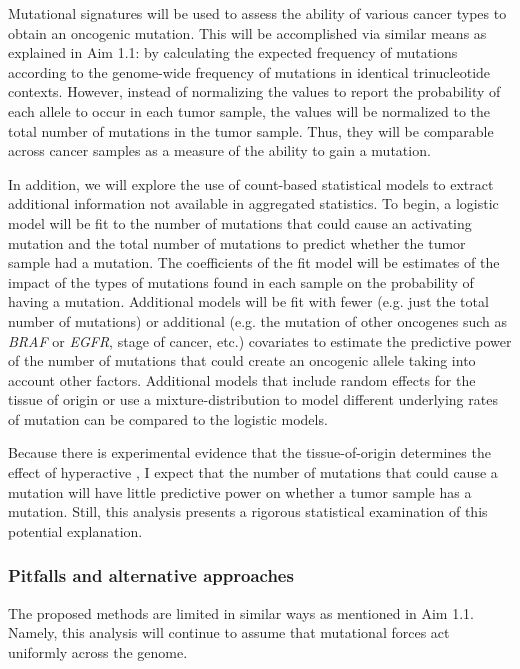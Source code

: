 Mutational signatures will be used to assess the ability of various cancer types to obtain an oncogenic \KRAS{} mutation.
This will be accomplished via similar means as explained in Aim 1.1: by calculating the expected frequency of \KRAS{} mutations according to the genome-wide frequency of mutations in identical trinucleotide contexts.
However, instead of normalizing the values to report the probability of each allele to occur in each tumor sample, the values will be normalized to the total number of mutations in the tumor sample.
Thus, they will be comparable across cancer samples as a measure of the ability to gain a \KRAS{} mutation.

In addition, we will explore the use of count-based statistical models to extract additional information not available in aggregated statistics.
To begin, a logistic model will be fit to the number of mutations that could cause an activating \KRAS{} mutation and the total number of mutations to predict whether the tumor sample had a \KRAS{} mutation.
The coefficients of the fit model will be estimates of the impact of the types of mutations found in each sample on the probability of having a \KRAS{} mutation.
Additional models will be fit with fewer (e.g. just the total number of mutations) or additional (e.g. the mutation of other oncogenes such as \emph{BRAF} or \emph{EGFR}, stage of cancer, etc.) covariates to estimate the predictive power of the number of mutations that could create an oncogenic \KRAS{} allele taking into account other factors.
Additional models that include random effects for the tissue of origin or use a mixture-distribution to model different underlying rates of mutation can be compared to the logistic models.

Because there is experimental evidence that the tissue-of-origin determines the effect of hyperactive \kras{}, I expect that the number of mutations that could cause a \KRAS{} mutation will have little predictive power on whether a tumor sample has a \KRAS{} mutation.
Still, this analysis presents a rigorous statistical examination of this potential explanation.

\subsubsection*{Pitfalls and alternative approaches}

The proposed methods are limited in similar ways as mentioned in Aim 1.1.
Namely, this analysis will continue to assume that mutational forces act uniformly across the genome.


